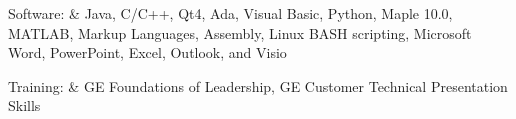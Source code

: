 \documentclass{resume}
\begin{document}
  \begin{skills}
    Software: & Java, C/C++, Qt4, Ada, Visual Basic, Python, Maple 10.0, MATLAB, Markup Languages, Assembly, Linux BASH scripting, Microsoft Word, PowerPoint, Excel, Outlook, and Visio \\
  \end{skills}
  \begin{skills}
    Training: & GE Foundations of Leadership, GE Customer Technical Presentation Skills \\
  \end{skills}
\end{document}
